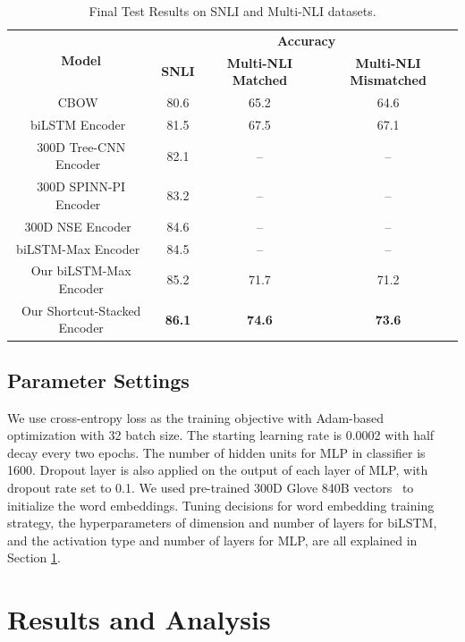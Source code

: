 \documentclass[11pt,letterpaper]{article}
\begin{document}
\begin{table}[ht!]
\begin{center}
\small
\begin{tabular}{|c|ccc|}
\hline
\multirow{2}{*}{\bf Model} & \multicolumn{3}{|c|}{\bf Accuracy} \\
\ & {\bf SNLI} & {\bf Multi-NLI Matched} & {\bf Multi-NLI Mismatched} \\
\hline
CBOW~\cite{williams2017broad} & 80.6 & 65.2 & 64.6 \\
biLSTM Encoder~\cite{williams2017broad} & 81.5 & 67.5 & 67.1 \\
300D Tree-CNN Encoder~\cite{mou2015natural} & 82.1 & -- & -- \\
300D SPINN-PI Encoder~\cite{bowman2016fast} & 83.2 & -- & -- \\
300D NSE Encoder~\cite{munkhdalai2016neural} & 84.6 & -- & -- \\
biLSTM-Max Encoder~\cite{conneau2017supervised} & 84.5 & -- & -- \\
\hline
Our biLSTM-Max Encoder & 85.2 & 71.7 & 71.2 \\
Our Shortcut-Stacked Encoder & {\bf 86.1} & {\bf 74.6} & {\bf 73.6}\\
\hline
\end{tabular}
\end{center}
\vspace{-7pt}
\caption{Final Test Results on SNLI and Multi-NLI datasets.
}
\vspace{-2pt}
\label{tab:encoder_snli}
\end{table}

\subsection{Parameter Settings}
We use cross-entropy loss as the training objective with Adam-based ~\cite{kingma2014adam} optimization with 32 batch size. The starting learning rate is 0.0002 with half decay every two epochs. The number of hidden units for MLP in classifier is 1600. Dropout layer is also applied on the output of each layer of MLP, with dropout rate set to 0.1. We used pre-trained 300D Glove 840B vectors~\cite{pennington2014glove} to initialize the word embeddings. Tuning decisions for word embedding training strategy, the hyperparameters of dimension and number of layers for biLSTM, and the activation type and number of layers for MLP, are all explained in Section \ref{sec:result}.



\section{Results and Analysis}
\label{sec:result}
\end{document}
